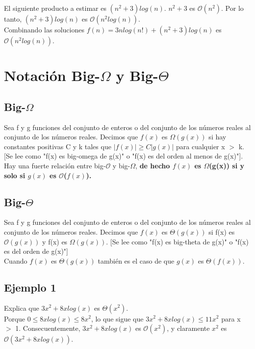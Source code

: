 \documentclass{article}
\begin{document}
El siguiente producto a estimar es $(n^2+3)log(n)$. $n^2+3$ es $\mathcal{O}(n^2)$. Por lo tanto, $(n^2+3)log(n)$ es $\mathcal{O}(n^2log(n))$. \\

Combinando las soluciones $f(n)=3nlog(n!)+(n^2+3)log(n)$ es $\mathcal{O}(n^2log(n))$.

\section{Notación Big-$\Omega$ y Big-$\Theta$}

\subsection{Big-$\Omega$}
Sea f y g funciones del conjunto de enteros o del conjunto de los números reales al conjunto de los números reales. Decimos que $f(x)$ es $\Omega(g(x))$ si hay constantes positivas C y k tales que $|f(x)| \geq  C|g(x)|$ para cualquier x $>$ k. [Se lee como "f(x) es big-omega de g(x)" o "f(x) es del orden al menos de g(x)"]. \\

Hay una fuerte relación entre big-$\mathcal{O}$ y big-$\Omega$, \textbf{de hecho $f(x)$ es $\Omega$(g(x)) si y solo si $g(x)$ es $\mathcal{O}$($f(x)$).} \\

\subsection{Big-$\Theta$}
Sea f y g funciones del conjunto de enteros o del conjunto de los números reales al conjunto de los números reales. Decimos que $f(x)$ es $\Theta(g(x))$ si f(x) es $\mathcal{O}(g(x))$ y f(x) es $\Omega(g(x))$. [Se lee como "f(x) es big-theta de g(x)" o "f(x) es del orden de g(x)"] \\

Cuando $f(x)$ es $\Theta(g(x))$ también es el caso de que $g(x)$ es $\Theta(f(x))$.

\subsection{Ejemplo 1}
Explica que $3x^2+8xlog(x)$ es $\Theta(x^2)$. \\

Porque $0 \leq 8xlog(x) \leq 8x^2$, lo que sigue que $3x^2+8xlog(x) \leq 11x^2$ para x $>$ 1. Consecuentemente, $3x^2+8xlog(x)$ es $\mathcal{O}(x^2)$, y claramente $x^2$ es $\mathcal{O}(3x^2+8xlog(x))$. \\
\end{document}
